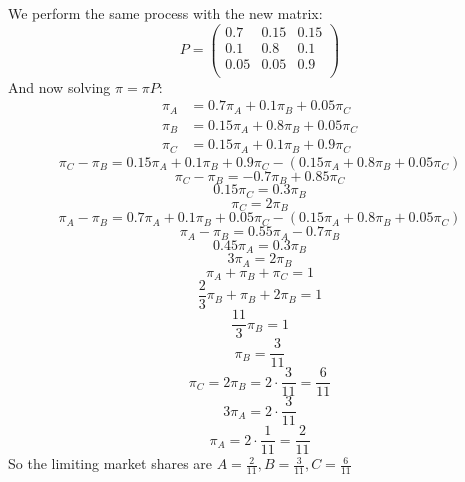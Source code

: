 \documentclass{article}
\begin{document}
{We perform the same process with the new matrix: 
\[
  P = 
  \begin{pmatrix}
    0.7 & 0.15 & 0.15 \\
    0.1 & 0.8 & 0.1 \\
    0.05 & 0.05 & 0.9 \\
  \end{pmatrix}
\]
And now solving \(\pi = \pi P\):
\begin{align*}
  \pi_A &= 0.7\pi_A + 0.1\pi_B + 0.05\pi_C \\
  \pi_B &= 0.15\pi_A + 0.8\pi_B + 0.05\pi_C \\
  \pi_C &= 0.15\pi_A + 0.1\pi_B + 0.9\pi_C
\end{align*}
\[
  \pi_C - \pi_B = 0.15\pi_A + 0.1\pi_B + 0.9\pi_C - (0.15\pi_A + 0.8\pi_B + 0.05\pi_C)
\]
\[
  \pi_C - \pi_B = -0.7\pi_B + 0.85\pi_C
\]
\[
  0.15\pi_C = 0.3\pi_B
\]
\[
  \pi_C = 2\pi_B
\]
\[
  \pi_A - \pi_B = 0.7\pi_A + 0.1\pi_B + 0.05\pi_C - (0.15\pi_A + 0.8\pi_B + 0.05\pi_C)
\]
\[
  \pi_A - \pi_B = 0.55\pi_A - 0.7\pi_B 
\]
\[
  0.45\pi_A = 0.3\pi_B
\]
\[
  3\pi_A = 2\pi_B
\]
\[
  \pi_A + \pi_B + \pi_C = 1
\]
\[
  \frac{2}{3}\pi_B + \pi_B + 2\pi_B = 1
\]
\[
  \frac{11}{3}\pi_B = 1
\]
\[
  \pi_B = \frac{3}{11}
\]
\[
  \pi_C = 2\pi_B = 2 \cdot \frac{3}{11} = \frac{6}{11}
\]
\[
  3\pi_A = 2 \cdot \frac{3}{11}
\]
\[
  \pi_A = 2 \cdot \frac{1}{11} = \frac{2}{11}
\]
So the limiting market shares are \(\boxed{A = \frac{2}{11}, B = \frac{3}{11}, C = \frac{6}{11}}\)

}
\end{document}
